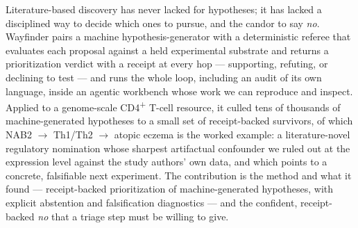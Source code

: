 Literature-based discovery has never lacked for hypotheses; it has lacked a disciplined way to decide which
ones to pursue, and the candor to say \emph{no}. Wayfinder pairs a machine hypothesis-generator with a
deterministic referee that evaluates each proposal against a held experimental substrate and returns a
prioritization verdict with a receipt at every hop --- supporting, refuting, or declining to test --- and runs the whole loop,
including an audit of its own language, inside an agentic workbench whose work we can reproduce and inspect.
Applied to a genome-scale CD4\textsuperscript{+} T-cell resource, it culled tens of thousands of machine-generated hypotheses
to a small set of receipt-backed survivors, of which NAB2 $\rightarrow$ Th1/Th2 $\rightarrow$ atopic eczema is the worked example: a
literature-novel regulatory nomination whose sharpest artifactual confounder we ruled out at the expression level against the study
authors' own data, and which points to a concrete, falsifiable next experiment. The contribution is the
method and what it found --- receipt-backed prioritization of machine-generated hypotheses, with explicit
abstention and falsification diagnostics --- and the confident, receipt-backed \emph{no} that a triage step
must be willing to give.
